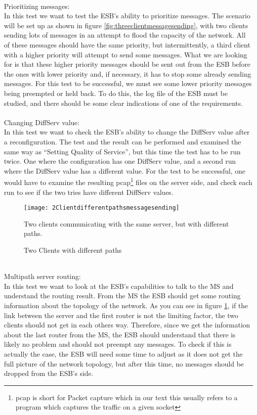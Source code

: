 \\   
Prioritizing messages:\\
    In this test we want to test the ESB’s ability to prioritize messages. The scenario will be set up as shown in figure \ref{fig:threeclientmessagesending}, with two clients sending lots of messages in an attempt to flood the capacity of the network. All of these messages should have the same priority, but intermittently, a third client with a higher priority will attempt to send some messages. What we are looking for is that these higher priority messages should be sent out from the ESB before the ones with lower priority and, if necessary, it has to stop some already sending messages. For this test to be successful, we must see some lower priority messages being preempted or held back. To do this, the log file of the ESB must be studied, and there should be some clear indications of one of the requirements.
\\\\
Changing DiffServ value:\\
    In this test we want to check the ESB’s ability to change the DiffServ value after a reconfiguration. The test and the result can be performed and examined the same way as “Setting Quality of Service”, but this time the test has to be run twice. One where the configuration has one DiffServ value, and a second run where the DiffServ value has a different value. For the test to be successful, one would have to examine the resulting \gls{pcap}\footnote{\Gls{pcap} is short for Packet capture which in our text this usually refers to a program which captures the traffic on a given socket} files on the server side, and check each run to see if the two tries have different DiffServ values.
\\
    \begin{figure}[h]
        \centering
        \texttt{[image: 2Clientdifferentpathsmessagesending]}
        \caption{Two Clients with different paths}
        Two  clients communicating with the same server, but with different paths.
        \label{fig:2 Clients different paths message sending}
    \end{figure}
\\    
Multipath server routing:\\
    In this test we want to look at the ESB’s capabilities to talk to the MS and understand the routing result. From the MS the ESB should get some routing information about the topology of the network. As you can see in figure \ref{fig:2 Clients different paths message sending}, if the link between the server and the first router is not the limiting factor, the two clients should not get in each others way. Therefore, since we get the information about the last router from the MS, the ESB should understand that there is likely no problem and should not preempt any messages. To check if this is actually the case, the ESB will need some time to adjust as it does not get the full picture of the network topology, but after this time, no messages should be dropped from the ESB’s side.
